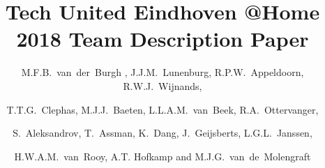 \documentclass[runningheads,a4paper]{llncs}
\begin{document}
\setlength{\headheight}{22pt}

\title{Tech United Eindhoven @Home \\2018 Team Description Paper}

\author{M.F.B.~van~der~Burgh , J.J.M.~Lunenburg, R.P.W.~Appeldoorn, R.W.J.~Wijnands, \and
T.T.G.~Clephas, M.J.J.~Baeten, L.L.A.M.~van~Beek, R.A.~Ottervanger, \and
S.~Aleksandrov, T.~Assman, K.~Dang, J.~Geijsberts, L.G.L.~Janssen, \and
H.W.A.M.~van~Rooy, A.T. Hofkamp and M.J.G.~van~de~Molengraft}




\maketitle

%
%
\end{document}
